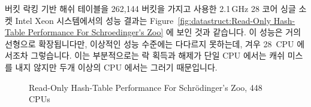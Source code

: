 버킷 락킹 기반 해쉬 테이블을 262,144 버킷을 가지고 사용한 2.1\,GHz 28 코어 싱글
소켓 Intel Xeon 시스템에서의 성능 결과는
Figure~\ref{fig:datastruct:Read-Only Hash-Table Performance For Schroedinger's Zoo}
에 보인 것과 같습니다.
이 성능은 거의 선형으로 확장됩니다만, 이상적인 성능 수준에는 다다르지 못하는데,
겨우 28~CPU 에서조차 그렇습니다.
이는 부분적으로는 락 획득과 해제가 단일 CPU 에서는 캐쉬 미스를 내지 않지만 두개
이상의 CPU 에서는 그러기 때문입니다.

\begin{figure}[tb]
\centering
{}
\caption{Read-Only Hash-Table Performance For Schr\"odinger's Zoo, 448 CPUs}
\label{fig:datastruct:Read-Only Hash-Table Performance For Schroedinger's Zoo; 448 CPUs}
\end{figure}

